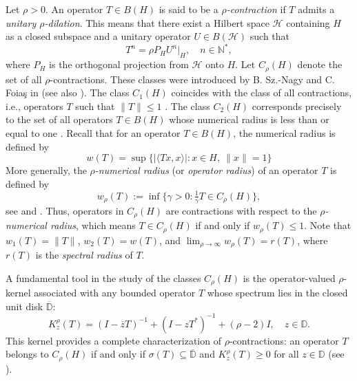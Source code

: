 \documentclass[12pt, reqno]{amsart}
\theoremstyle{definition}
\theoremstyle{remark}
\numberwithin{equation}{section}
\begin{document}
Let $\rho >0$. An operator $T \in B(H)$  is said to be  a \emph{$\rho$-contraction} 
if $T$ admits a \emph{unitary $\rho$-dilation}. 
This means that there exist a Hilbert space $\mathcal{H}$ containing $H$ as a closed subspace and a 
unitary operator $U \in B(\mathcal{H})$ such that 
\begin{equation}\label{eq:rhodil}
	T^n = \rho P_H U^n|_H, \quad n \in \mathbb{N}^{\ast},
\end{equation}
where $P_H$ is the orthogonal projection from $\mathcal{H}$ onto $H$. Let $C_\rho(H)$ denote 
the set of all $\rho$-contractions. These classes were introduced by B. Sz.-Nagy and C. Foia\c{s} 
in \cite{SzNF1} (see also \cite{SzNFBK}). The class $C_1(H)$ coincides with the class of all 
contractions, i.e., operators $T$ such that $\|T\| \leq 1$ \cite{SzN}. The class $C_2(H)$ corresponds 
precisely to the set of all operators $T \in B(H)$ whose numerical radius is less than or equal to one \cite{Be}. Recall  that for an operator $T \in B(H)$, the numerical radius is defined by
\[ w(T) = \sup\{ |\langle Tx,x\rangle | : x \in H,\ \|x\| = 1\} \]
 More generally,   the \emph{$\rho$-numerical radius} (or \emph{operator radius}) of an operator 
$T$ is defined by
\begin{equation}\label{eq:1-rad}
	w_\rho(T) := \inf\{ \gamma > 0 : \tfrac{1}{\gamma}T \in C_\rho(H)\},
\end{equation}
see \cite{H1} and \cite{W}. Thus, operators in $C_\rho(H)$ are contractions with respect to the 
\emph{$\rho$-numerical radius}, which means $T \in C_\rho(H)$ if and only if $w_\rho(T) \leq 1$. Note that $w_1(T) = \|T\|$, $w_2(T) = w(T)$, and 
$\lim_{\rho \to \infty} w_\rho(T) = r(T)$, where $r(T)$ is the \emph{spectral radius} of $T$.

A fundamental tool in the study of the classes $C_\rho(H)$ is the operator-valued $\rho$-kernel associated with any bounded operator $T$ whose spectrum lies in the closed unit disk $\overline{\mathbb{D}}$:
\begin{equation}\label{eq:kernel}
	K_{z}^{\rho}(T) = (I - \overline{z}T)^{-1} + (I - zT^{*})^{-1} + (\rho - 2)I, \quad z \in \mathbb{D}.
\end{equation}
This kernel provides a complete characterization of $\rho$-contractions: an operator $T$ belongs to $C_\rho(H)$ if and only if $\sigma(T) \subseteq \overline{\mathbb{D}}$ and $K_{z}^{\rho}(T) \geq 0$ for all $z \in \mathbb{D}$ (see \cite{CaF_2}).
\end{document}
